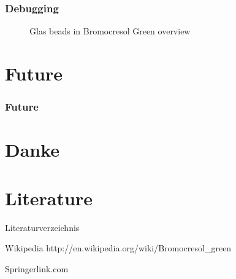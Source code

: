 \begin{frame}
	\frametitle{Debugging}
	\begin{figure}
	  \centering
	  \caption{Glas beads in Bromocresol Green overview}
	\end{figure}
 
\end{frame}

\section{Future}
\begin{frame}
	\frametitle{Future}
	\vspace{1cm} %
	\begin{figure}
	  \centering
	\end{figure}

\end{frame}

\section{Danke}



\section{Literature}
\begin{frame}{Literaturverzeichnis}
	\begin{thebibliography}{10}
    
	\beamertemplateonlinebibitems
	Wikipedia
	\newblock {}
	\newblock http://en.wikipedia.org/wiki/Bromocresol\_green

	\beamertemplatearticlebibitems
	Springerlink.com
	\newblock {}
  \end{thebibliography}
\end{frame}

